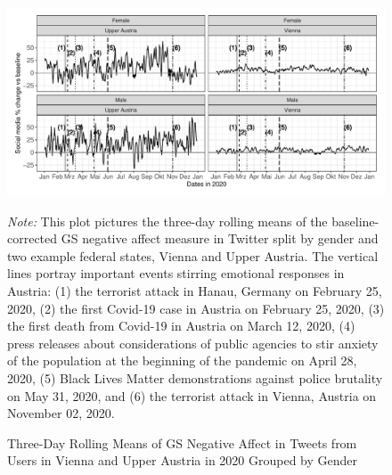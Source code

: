 \documentclass[
  english,
  jou,floatsintext]{apa7}
\begin{document}
\begin{figure}
\caption{Three-Day Rolling Means of GS Negative Affect in Tweets from Users in Vienna and Upper Austria in 2020 Grouped by Gender}\label{fig:GS-gender-region}
\includegraphics[width=\textwidth]{plots/plt_negGs} 

\textit{Note:} This plot pictures the three-day rolling means of the baseline-corrected GS negative affect measure in Twitter split by gender and two example federal states, Vienna and Upper Austria. The vertical lines portray important events stirring emotional responses in Austria: (1) the terrorist attack in Hanau, Germany on February 25, 2020, (2) the first Covid-19 case in Austria on February 25, 2020, (3) the first death from Covid-19 in Austria on March 12, 2020, (4) press releases about considerations of public agencies to stir anxiety of the population at the beginning of the pandemic on April 28, 2020, (5) Black Lives Matter demonstrations against police brutality on May 31, 2020, and (6) the terrorist attack in Vienna, Austria on November 02, 2020.
\end{figure}
\end{document}
